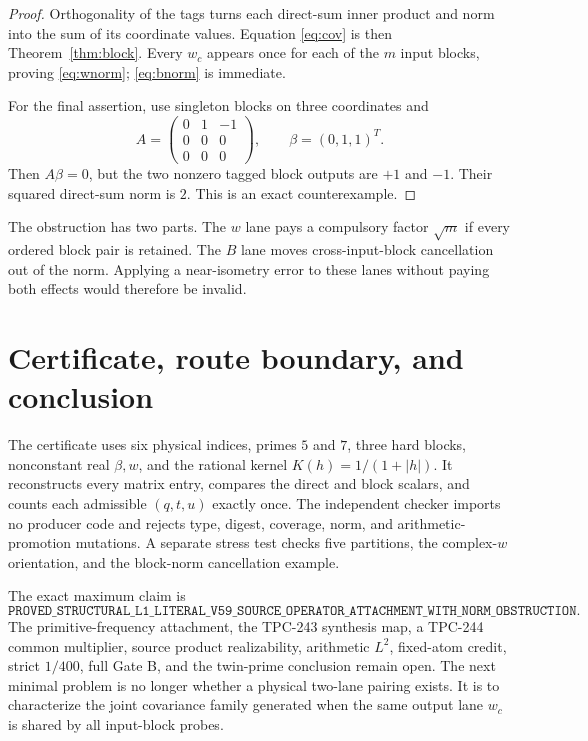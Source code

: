 \documentclass[11pt]{article}
\begin{document}
\begin{proof}
Orthogonality of the tags turns each direct-sum inner product and norm into
the sum of its coordinate values.  Equation \eqref{eq:cov} is then
Theorem~\ref{thm:block}.  Every $w_c$ appears once for each of the $m$ input
blocks, proving \eqref{eq:wnorm}; \eqref{eq:bnorm} is immediate.

For the final assertion, use singleton blocks on three coordinates and
\[
 A=\begin{pmatrix}0&1&-1\\0&0&0\\0&0&0\end{pmatrix},
 \qquad \beta=(0,1,1)^T.
\]
Then $A\beta=0$, but the two nonzero tagged block outputs are $+1$ and $-1$.
Their squared direct-sum norm is $2$.  This is an exact counterexample.
\end{proof}

The obstruction has two parts.  The $w$ lane pays a compulsory factor
$\sqrt m$ if every ordered block pair is retained.  The $B$ lane moves
cross-input-block cancellation out of the norm.  Applying a near-isometry
error to these lanes without paying both effects would therefore be invalid.

\section{Certificate, route boundary, and conclusion}

The certificate uses six physical indices, primes $5$ and $7$, three hard
blocks, nonconstant real $\beta,w$, and the rational kernel
$K(h)=1/(1+|h|)$.  It reconstructs every matrix entry, compares the direct and
block scalars, and counts each admissible $(q,t,u)$ exactly once.  The
independent checker imports no producer code and rejects type, digest,
coverage, norm, and arithmetic-promotion mutations.  A separate stress test
checks five partitions, the complex-$w$ orientation, and the block-norm
cancellation example.

The exact maximum claim is
\[
\texttt{PROVED\_STRUCTURAL\_L1\_LITERAL\_V59\_SOURCE\_OPERATOR\_}
\texttt{ATTACHMENT\_WITH\_NORM\_OBSTRUCTION}.
\]
The primitive-frequency attachment, the TPC-243 synthesis map, a TPC-244
common multiplier, source product realizability, arithmetic $L^2$, fixed-atom
credit, strict $1/400$, full Gate B, and the twin-prime conclusion remain
open.  The next minimal problem is no longer whether a physical two-lane
pairing exists.  It is to characterize the joint covariance family generated
when the same output lane $w_c$ is shared by all input-block probes.



\end{document}
